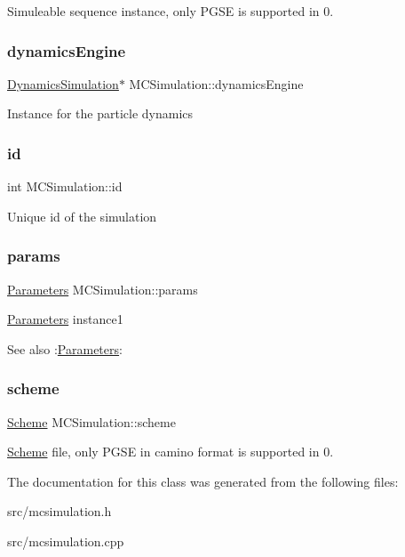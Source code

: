 Simuleable sequence instance, only P\+G\+SE is supported in 0. \mbox{\label{class_m_c_simulation_ac453455b2dfb994b7b1a4b7823bd3dc9}} 
\subsubsection{\texorpdfstring{dynamics\+Engine}{dynamicsEngine}}
{\footnotesize\ttfamily \hyperlink{class_dynamics_simulation}{Dynamics\+Simulation}$\ast$ M\+C\+Simulation\+::dynamics\+Engine}

Instance for the particle dynamics \mbox{\label{class_m_c_simulation_aff828a83a905ae188146d3ffaa12a1bc}} 
\subsubsection{\texorpdfstring{id}{id}}
{\footnotesize\ttfamily int M\+C\+Simulation\+::id}

Unique id of the simulation \mbox{\label{class_m_c_simulation_aecb8470cb31fa67e38c5d5acd5a80bef}} 
\subsubsection{\texorpdfstring{params}{params}}
{\footnotesize\ttfamily \hyperlink{class_parameters}{Parameters} M\+C\+Simulation\+::params}

\hyperlink{class_parameters}{Parameters} instance1 \begin{DoxySeeAlso}{See also}
\+:\hyperlink{class_parameters}{Parameters}\+: 
\end{DoxySeeAlso}
\mbox{\label{class_m_c_simulation_a87ba6332f1f49024a442981b477360c4}} 
\subsubsection{\texorpdfstring{scheme}{scheme}}
{\footnotesize\ttfamily \hyperlink{class_scheme}{Scheme} M\+C\+Simulation\+::scheme}

\hyperlink{class_scheme}{Scheme} file, only P\+G\+SE in camino format is supported in 0. 

The documentation for this class was generated from the following files\+:\begin{DoxyCompactItemize}
\item 
src/mcsimulation.\+h\item 
src/mcsimulation.\+cpp\end{DoxyCompactItemize}
